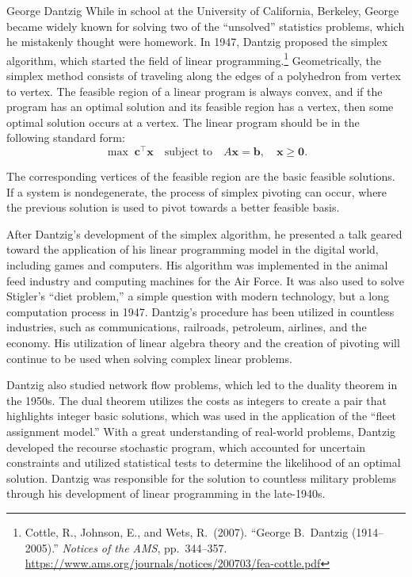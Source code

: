 \begin{pioneerspotlight}{George Dantzig}
While in school at the University of California, Berkeley, George became widely known for solving two of the ``unsolved'' statistics problems, which he mistakenly thought were homework. In 1947, Dantzig proposed the simplex algorithm, which started the field of linear programming.\footnote{Cottle, R., Johnson, E., and Wets, R.\ (2007). ``George B.\ Dantzig (1914--2005).'' \emph{Notices of the AMS}, pp.~344--357. \url{https://www.ams.org/journals/notices/200703/fea-cottle.pdf}}
Geometrically, the simplex method consists of traveling along the edges of a polyhedron from vertex to vertex. The feasible region of a linear program is always convex, and if the program has an optimal solution and its feasible region has a vertex, then some optimal solution occurs at a vertex. The linear program should be in the following standard form:
\[
\max \; \mathbf{c}^\top \mathbf{x} \quad \text{subject to} \quad A \mathbf{x} = \mathbf{b}, \quad \mathbf{x} \geq \mathbf{0}.
\]

The corresponding vertices of the feasible region are the basic feasible solutions. If a system is nondegenerate, the process of simplex pivoting can occur, where the previous solution is used to pivot towards a better feasible basis.

After Dantzig's development of the simplex algorithm, he presented a talk geared toward the application of his linear programming model in the digital world, including games and computers. His algorithm was implemented in the animal feed industry and computing machines for the Air Force. It was also used to solve Stigler's ``diet problem,'' a simple question with modern technology, but a long computation process in 1947. Dantzig's procedure has been utilized in countless industries, such as communications, railroads, petroleum, airlines, and the economy. His utilization of linear algebra theory and the creation of pivoting will continue to be used when solving complex linear problems.

Dantzig also studied network flow problems, which led to the duality theorem in the 1950s. The dual theorem utilizes the costs as integers to create a pair that highlights integer basic solutions, which was used in the application of the ``fleet assignment model.'' With a great understanding of real-world problems, Dantzig developed the recourse stochastic program, which accounted for uncertain constraints and utilized statistical tests to determine the likelihood of an optimal solution. Dantzig was responsible for the solution to countless military problems through his development of linear programming in the late-1940s.

\end{pioneerspotlight}
